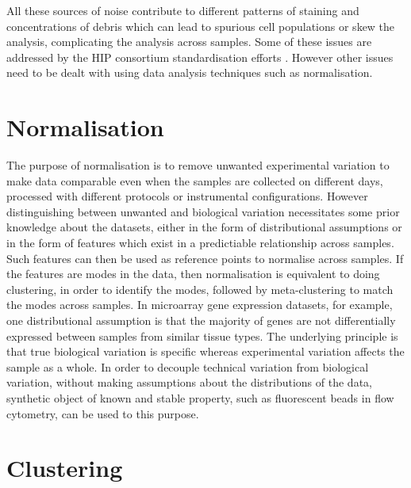 All these sources of noise contribute to different patterns of staining and concentrations of debris
which can lead to spurious cell populations or skew the analysis, complicating the analysis across samples.
Some of these issues are addressed by the \gls{HIP} consortium standardisation efforts \citep{Maecker:2012gl}.
However other issues need to be dealt with using data analysis techniques such as normalisation.

\section{Normalisation}

The purpose of normalisation is to remove unwanted experimental variation to make data comparable even when the samples are
collected on different days, processed with different protocols or instrumental configurations.
However distinguishing between unwanted and biological variation necessitates some prior knowledge about the datasets, either in the form of distributional assumptions
or in the form of features which exist in a predictiable relationship across samples.
Such features can then be used as reference points to normalise across samples.
If the features are modes in the data, then normalisation is equivalent to doing clustering, in order to identify the modes,
followed by meta-clustering to match the modes across samples.
In microarray gene expression datasets, for example, one distributional assumption is that the majority of genes are not differentially expressed between samples from
similar tissue types.
The underlying principle is that true biological variation is specific whereas experimental variation affects the sample as a whole.
In order to decouple technical variation from biological variation, without making assumptions about the distributions of the data,
synthetic object of known and stable property, such as fluorescent beads in flow cytometry, can be used to this purpose.



\section{Clustering}

